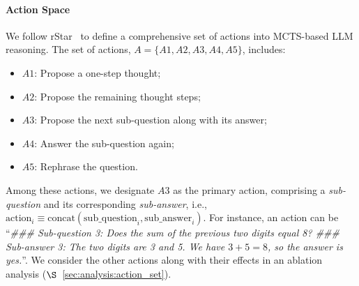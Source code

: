 \paragraph{Action Space}
We follow rStar~\cite{qi2024mutual} to define a comprehensive set of actions into MCTS-based LLM reasoning. 
The set of actions, $A = \{A1, A2, A3, A4, A5\}$, includes:
\vspace{-10pt}
\begin{itemize}
\setlength\itemsep{0.0em}
    \item $A1$: Propose a one-step thought;
    \item $A2$: Propose the remaining thought steps;
    \item $A3$: Propose the next sub-question along with its answer;
    \item $A4$: Answer the sub-question again;
    \item $A5$: Rephrase the question.
\end{itemize}
\vspace{-10pt}
Among these actions, we designate $A3$ as the primary action, comprising a \emph{sub-question} and its corresponding \emph{sub-answer}, i.e., $\text{action}_i \equiv \text{concat}(\text{sub\_question}_i,\text{sub\_answer}_i)$.
For instance, an action can be ``\textit{\#\#\# Sub-question 3: Does the sum of the previous two digits equal 8? \#\#\# Sub-answer 3: The two digits are 3 and 5. We have $3 + 5 = 8$, so the answer is yes.}''. 
We consider the other actions along with their effects in an ablation analysis ($\S$~\ref{sec:analysis:action_set}).
